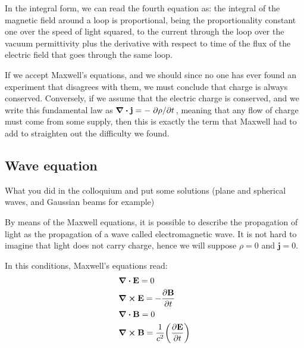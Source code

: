 \documentclass[11pt,a4paper]{article}
\begin{document}
In the integral form, we can read the fourth equation as: the integral of the magnetic field around a loop is proportional, being the proportionality constant one over the speed of light squared, to the current through the loop over the vacuum permittivity plus the derivative with respect to time of the flux of the electric field that goes through the same loop.

If we accept Maxwell's equations, and we should since no one has ever found an experiment that disagrees with them, we must conclude that charge is always conserved. Conversely, if we assume that the electric charge is conserved, and we write this fundamental law as $\div\vb{j}=-\pdv*{\rho}{t}$, meaning that any flow of charge must come from some supply, then this is exactly the term that Maxwell had to add to straighten out the difficulty we found.

\subsection{Wave equation}

What you did in the colloquium and put some solutions (plane and spherical waves, and Gaussian beams for example)

By means of the Maxwell equations, it is possible to describe the propagation of light as the propagation of a wave called electromagnetic wave. It is not hard to imagine that light does not carry charge, hence we will suppose $\rho=0$ and $\textbf{j}=0$.

In this conditions, Maxwell's equations read:
\begin{subequations}\label{eq:maxwell_equations_wo_charge}
\begin{align}
&\div\vb{E}=0\label{eq:maxwell__wo_1}\\
&\curl\vb{E}=-\pdv{\vb{B}}{t}\label{eq:maxwell_wo_2}\\
&\div\vb{B}=0\label{eq:maxwell_wo_3}\\
&\curl\vb{B}=\frac{1}{c^2}\qty(\pdv{\vb{E}}{t})\label{eq:maxwell_wo_4}
\end{align}
\end{subequations}
\end{document}
